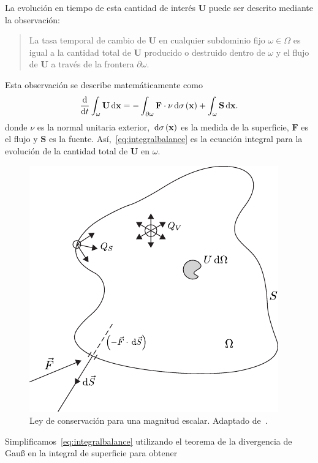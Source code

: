 La evolución en tiempo de esta cantidad de interés $\mathbf{U}$
puede ser descrito mediante la observación:
\begin{quote}
	La tasa temporal de cambio de $\mathbf{U}$ en cualquier subdominio
	fijo $\omega\in\Omega$ es igual a la cantidad total de
	$\mathbf{U}$ producido o destruido dentro de $\omega$ y el flujo
	de $\mathbf{U}$ a través de la frontera $\partial\omega$.
\end{quote}
Esta observación se describe matemáticamente como
\begin{equation}\label{eq:integralbalance}
	\diff{}{t}
	\int_{\omega}
	\mathbf{U}\dl{\mathbf{x}}=
	-\int_{\partial\omega}
	\mathbf{F}\cdot\nu\dl{\sigma\left(\mathbf{x}\right)}+
	\int_{\omega}
	\mathbf{S}\dl{\mathbf{x}}.
\end{equation}
donde $\nu$ es la normal unitaria exterior,
$\dl{\sigma\left(\mathbf{x}\right)}$ es la medida de la superficie,
$\mathbf{F}$ es el flujo y $\mathbf{S}$ es la fuente.
Así,~\eqref{eq:integralbalance} es la ecuación integral para la
evolución de la cantidad total de $\mathbf{U}$ en $\omega$.
\begin{figure}[ht!]
	\sidecaption
	\includegraphics{conservationscheme}
	\caption{Ley de conservación para una magnitud escalar.
		Adaptado de~\cite{Hirsch2007}.}
	\label{fig:1}       %
\end{figure}
Simplificamos~\eqref{eq:integralbalance} utilizando el teorema de la
divergencia de Gauß en la integral de superficie para obtener
